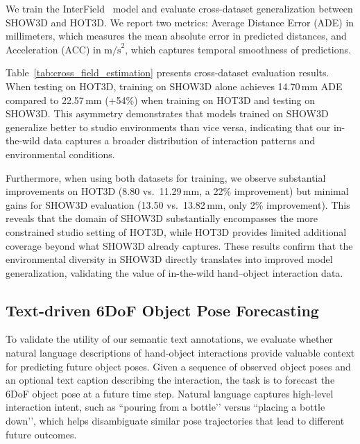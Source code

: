 \documentclass[10pt,twocolumn,letterpaper]{article}
\begin{document}
 We train the InterField~\cite{fan2023arctic} model and evaluate cross-dataset generalization between SHOW3D and HOT3D. We report two metrics: Average Distance Error (ADE) in millimeters, which measures the mean absolute error in predicted distances, and Acceleration (ACC) in $\text{m/s}^2$, which captures temporal smoothness of predictions.

 Table~\ref{tab:cross_field_estimation} presents cross-dataset evaluation results. When testing on HOT3D, training on SHOW3D alone achieves 14.70\,mm ADE compared to 22.57\,mm (+54\%) when training on HOT3D and testing on SHOW3D. This asymmetry demonstrates that models trained on SHOW3D generalize better to studio environments than vice versa, indicating that our in-the-wild data captures a broader distribution of interaction patterns and environmental conditions.

Furthermore, when using both datasets for training, we observe substantial improvements on HOT3D (8.80 vs.\ 11.29\,mm, a 22\% improvement) but minimal gains for SHOW3D evaluation (13.50 vs.\ 13.82\,mm, only 2\% improvement). This reveals that the domain of SHOW3D substantially encompasses the more constrained studio setting of HOT3D, while HOT3D provides limited additional coverage beyond what SHOW3D already captures. These results confirm that the environmental diversity in SHOW3D directly translates into improved model generalization, validating the value of in-the-wild hand--object interaction data.


\subsection{Text-driven 6DoF Object Pose Forecasting}

To validate the utility of our semantic text annotations, we evaluate whether natural language descriptions of hand-object interactions provide valuable context for predicting future object poses. Given a sequence of observed object poses and an optional text caption describing the interaction, the task is to forecast the 6DoF object pose at a future time step.
Natural language captures high-level interaction intent, such as ``pouring from a bottle’’ versus ``placing a bottle down’’, which helps disambiguate similar pose trajectories that lead to different future outcomes. 
\end{document}
